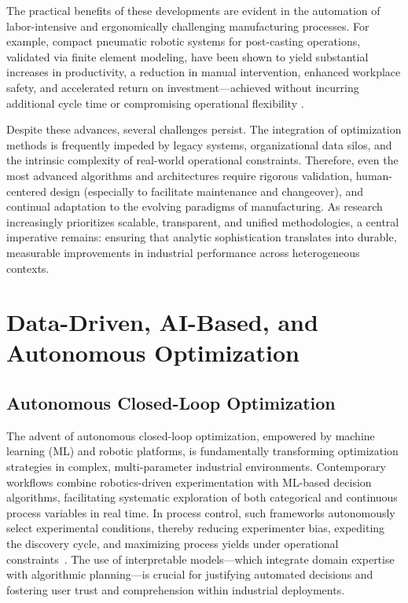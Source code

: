 The practical benefits of these developments are evident in the automation of labor-intensive and ergonomically challenging manufacturing processes. For example, compact pneumatic robotic systems for post-casting operations, validated via finite element modeling, have been shown to yield substantial increases in productivity, a reduction in manual intervention, enhanced workplace safety, and accelerated return on investment—achieved without incurring additional cycle time or compromising operational flexibility \cite{ref62}.

Despite these advances, several challenges persist. The integration of optimization methods is frequently impeded by legacy systems, organizational data silos, and the intrinsic complexity of real-world operational constraints. Therefore, even the most advanced algorithms and architectures require rigorous validation, human-centered design (especially to facilitate maintenance and changeover), and continual adaptation to the evolving paradigms of manufacturing. As research increasingly prioritizes scalable, transparent, and unified methodologies, a central imperative remains: ensuring that analytic sophistication translates into durable, measurable improvements in industrial performance across heterogeneous contexts.

\section{Data-Driven, AI-Based, and Autonomous Optimization}

\subsection{Autonomous Closed-Loop Optimization}

The advent of autonomous closed-loop optimization, empowered by machine learning (ML) and robotic platforms, is fundamentally transforming optimization strategies in complex, multi-parameter industrial environments. Contemporary workflows combine robotics-driven experimentation with ML-based decision algorithms, facilitating systematic exploration of both categorical and continuous process variables in real time. In process control, such frameworks autonomously select experimental conditions, thereby reducing experimenter bias, expediting the discovery cycle, and maximizing process yields under operational constraints~\cite{ref79}. The use of interpretable models—which integrate domain expertise with algorithmic planning—is crucial for justifying automated decisions and fostering user trust and comprehension within industrial deployments.

